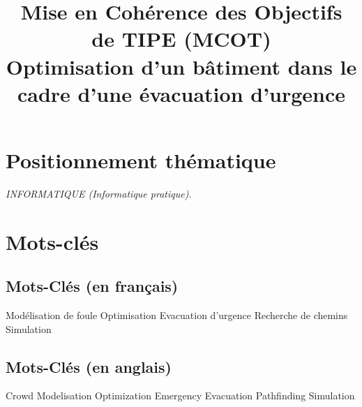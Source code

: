 \documentclass[12pt]{article}
\title{Mise en Cohérence des Objectifs de TIPE (MCOT) \\
Optimisation d'un bâtiment dans le cadre d'une évacuation d'urgence}
\author{}
\date{}
\begin{document}
\maketitle
\section*{Positionnement thématique}
\textit{INFORMATIQUE (Informatique pratique).}

\section*{Mots-clés}
\begin{multicols}{2}

    \subsection*{Mots-Clés (en français)}
    Modélisation de foule
    \newline Optimisation
    \newline Evacuation d'urgence
    \newline Recherche de chemins
    \newline Simulation 

    \columnbreak %

    \subsection*{Mots-Clés (en anglais)}
    Crowd Modelisation
    \newline Optimization
    \newline Emergency Evacuation
    \newline Pathfinding
    \newline Simulation

\end{multicols}
\end{document}
